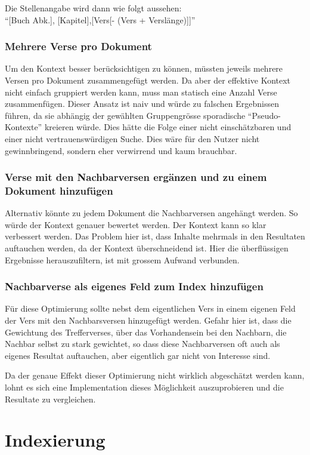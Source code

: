 Die Stellenangabe wird dann wie folgt aussehen:\\
"`[Buch Abk.], [Kapitel],[Vers[- (Vers + Verslänge)]]"'

\subsubsection{Mehrere Verse pro Dokument}
Um den Kontext besser berücksichtigen zu können, müssten jeweils mehrere Versen pro Dokument zusammengefügt werden.
Da aber der effektive Kontext nicht einfach gruppiert werden kann, muss man statisch eine Anzahl Verse zusammenfügen.
Dieser Ansatz ist naiv und würde zu falschen Ergebnissen führen, da sie abhängig der gewählten Gruppengrösse sporadische "`Pseudo-Kontexte"' kreieren würde.
Dies hätte die Folge einer nicht einschätzbaren und einer nicht vertrauenswürdigen Suche.
Dies wäre für den Nutzer nicht gewinnbringend, sondern eher verwirrend und kaum brauchbar.

\subsubsection{Verse mit den Nachbarversen ergänzen und zu einem Dokument hinzufügen}
Alternativ könnte zu jedem Dokument die Nachbarversen angehängt werden. So würde der Kontext genauer bewertet werden.
Der Kontext kann so klar verbessert werden.
Das Problem hier ist, dass Inhalte mehrmals in den Resultaten auftauchen werden, da der Kontext überschneidend ist.
Hier die überflüssigen Ergebnisse herauszufiltern, ist mit grossem Aufwand verbunden.

\subsubsection{Nachbarverse als eigenes Feld zum Index hinzufügen}
Für diese Optimierung sollte nebst dem eigentlichen Vers in einem eigenen Feld der Vers mit den Nachbarsversen hinzugefügt werden.
Gefahr hier ist, dass die Gewichtung des Trefferverses, über das Vorhandensein bei den Nachbarn, die Nachbar selbst zu stark gewichtet, so dass diese Nachbarversen oft auch als eigenes Resultat auftauchen, aber eigentlich gar nicht von Interesse sind.

Da der genaue Effekt dieser Optimierung nicht wirklich abgeschätzt werden kann, lohnt es sich eine Implementation dieses Möglichkeit auszuprobieren und die Resultate zu vergleichen.


\section{Indexierung}

